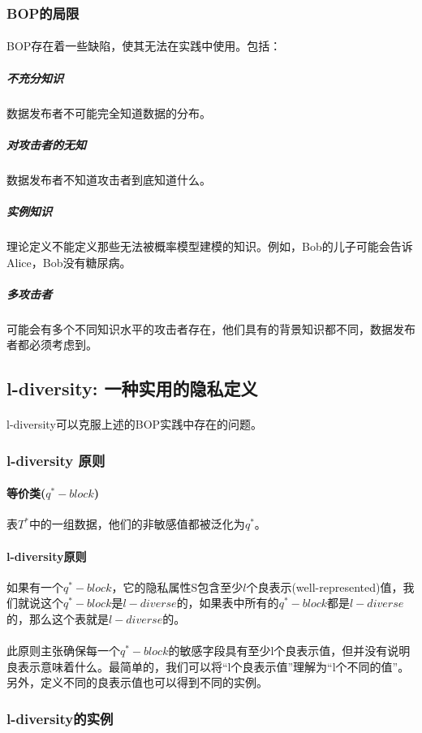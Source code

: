 \documentclass[12pt,a4paper]{article}
\begin{document}
\subsubsection{BOP的局限}
	
\paragraph{} BOP存在着一些缺陷，使其无法在实践中使用。包括：
	\subparagraph{不充分知识} 数据发布者不可能完全知道数据的分布。
	\subparagraph{对攻击者的无知} 数据发布者不知道攻击者到底知道什么。
	\subparagraph{实例知识} 理论定义不能定义那些无法被概率模型建模的知识。例如，Bob的儿子可能会告诉Alice，Bob没有糖尿病。
	\subparagraph{多攻击者} 可能会有多个不同知识水平的攻击者存在，他们具有的背景知识都不同，数据发布者都必须考虑到。
	
\subsection{l-diversity: 一种实用的隐私定义}
\paragraph{} l-diversity可以克服上述的BOP实践中存在的问题。

\subsubsection{l-diversity 原则}
\paragraph{等价类($q^*-block$)} 表$T^*$中的一组数据，他们的非敏感值都被泛化为$q^*$。
\paragraph{l-diversity原则} 如果有一个$q^*-block$，它的隐私属性S包含至少$l$个良表示(well-represented)值，我们就说这个$q^*-block$是$l-diverse$的，如果表中所有的$q^*-block$都是$l-diverse$的，那么这个表就是$l-diverse$的。
\paragraph{} 此原则主张确保每一个$q^*-block$的敏感字段具有至少l个良表示值，但并没有说明良表示意味着什么。最简单的，我们可以将“l个良表示值”理解为“l个不同的值”。另外，定义不同的良表示值也可以得到不同的实例。
\subsubsection{l-diversity的实例}
\end{document}
